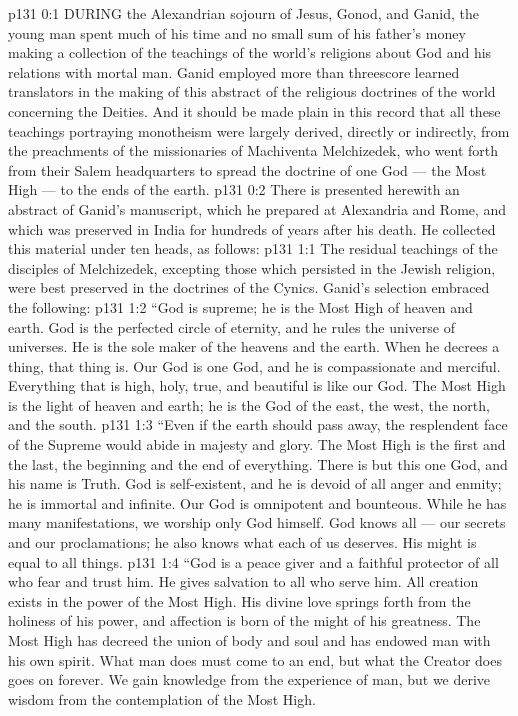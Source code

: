 \vs p131 0:1 DURING the Alexandrian sojourn of Jesus, Gonod, and Ganid, the young man spent much of his time and no small sum of his father’s money making a collection of the teachings of the world’s religions about God and his relations with mortal man. Ganid employed more than threescore learned translators in the making of this abstract of the religious doctrines of the world concerning the Deities. And it should be made plain in this record that all these teachings portraying monotheism were largely derived, directly or indirectly, from the preachments of the missionaries of Machiventa Melchizedek, who went forth from their Salem headquarters to spread the doctrine of one God --- the Most High --- to the ends of the earth.
\vs p131 0:2 There is presented herewith an abstract of Ganid’s manuscript, which he prepared at Alexandria and Rome, and which was preserved in India for hundreds of years after his death. He collected this material under ten heads, as follows:
\vs p131 1:1 The residual teachings of the disciples of Melchizedek, excepting those which persisted in the Jewish religion, were best preserved in the doctrines of the Cynics. Ganid’s selection embraced the following:
\vs p131 1:2 \pc “God is supreme; he is the Most High of heaven and earth. God is the perfected circle of eternity, and he rules the universe of universes. He is the sole maker of the heavens and the earth. When he decrees a thing, that thing is. Our God is one God, and he is compassionate and merciful. Everything that is high, holy, true, and beautiful is like our God. The Most High is the light of heaven and earth; he is the God of the east, the west, the north, and the south.
\vs p131 1:3 “Even if the earth should pass away, the resplendent face of the Supreme would abide in majesty and glory. The Most High is the first and the last, the beginning and the end of everything. There is but this one God, and his name is Truth. God is self\hyp{}existent, and he is devoid of all anger and enmity; he is immortal and infinite. Our God is omnipotent and bounteous. While he has many manifestations, we worship only God himself. God knows all --- our secrets and our proclamations; he also knows what each of us deserves. His might is equal to all things.
\vs p131 1:4 “God is a peace giver and a faithful protector of all who fear and trust him. He gives salvation to all who serve him. All creation exists in the power of the Most High. His divine love springs forth from the holiness of his power, and affection is born of the might of his greatness. The Most High has decreed the union of body and soul and has endowed man with his own spirit. What man does must come to an end, but what the Creator does goes on forever. We gain knowledge from the experience of man, but we derive wisdom from the contemplation of the Most High.
